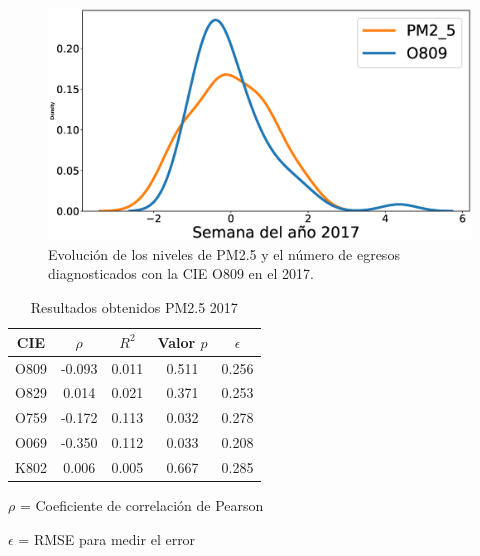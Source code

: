 \begin{figure}[h!]
\setcounter{figure}{4} %
\captionsetup{type=figure} %
\begin{center}
   \includegraphics[trim=61 0 0 0,clip,width=1\textwidth]{PM2_5_O809_2017.eps}
   \end{center}
    \caption[Series de tiempo 2017 PM2.5 y O809]{Evolución de los niveles de PM2.5 y el número de egresos diagnosticados con la CIE O809 en el 2017.}
    \label{serie_de_tiempo_2017_PM25}
\end{figure}

\begin{table}[hbt!]
\centering
\caption{Resultados obtenidos PM2.5 2017}
\label{tab:Resultados obtenidos PM2.5 2017}
\vspace{0.5cm}
\begin{threeparttable}
\begin{tabular}{|c|c|c|c|c|}
	\hline
	CIE & $\rho$ & $R^2$ & Valor $p$ & $\epsilon$\\
	\hline
	O809 & -0.093 & 0.011 & 0.511 & 0.256 \\
	\hline
	O829 & 0.014 & 0.021 & 0.371 & 0.253 \\
	\hline
	O759 & -0.172 & 0.113 & 0.032 & 0.278 \\
	\hline
	O069 & -0.350 & 0.112 & 0.033 & 0.208 \\
	\hline
	K802 & 0.006 & 0.005 & 0.667 & 0.285 \\
	\hline
\end{tabular}
\begin{tablenotes}
\footnotesize
\item{$\rho$ = Coeficiente de correlación de Pearson}
\item{$\epsilon$ = RMSE para medir el error}
\end{tablenotes}
\end{threeparttable}
\end{table}

